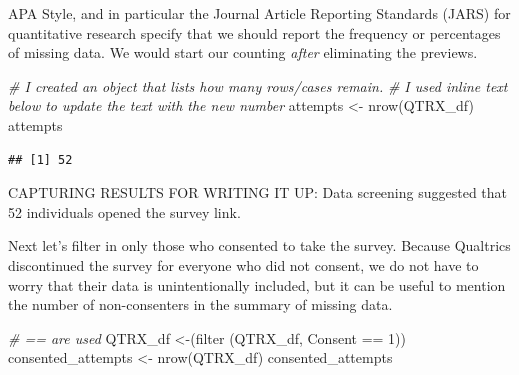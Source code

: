 \documentclass[
  english,
]{book}
\newenvironment{Shaded}{\begin{snugshade}}{\end{snugshade}}
\newcommand{\CommentTok}[1]{\textcolor[rgb]{0.56,0.35,0.01}{\textit{#1}}}
\newcommand{\DecValTok}[1]{\textcolor[rgb]{0.00,0.00,0.81}{#1}}
\newcommand{\FunctionTok}[1]{\textcolor[rgb]{0.00,0.00,0.00}{#1}}
\newcommand{\NormalTok}[1]{#1}
\newcommand{\OtherTok}[1]{\textcolor[rgb]{0.56,0.35,0.01}{#1}}
\newcommand{\SpecialCharTok}[1]{\textcolor[rgb]{0.00,0.00,0.00}{#1}}
\newcommand{\StringTok}[1]{\textcolor[rgb]{0.31,0.60,0.02}{#1}}
\begin{document}
\begin{Shaded}
\end{Shaded}

APA Style, and in particular the Journal Article Reporting Standards (JARS) for quantitative research specify that we should report the frequency or percentages of missing data. We would start our counting \emph{after} eliminating the previews.

\begin{Shaded}
\begin{Highlighting}[]
\CommentTok{\# I created an object that lists how many rows/cases remain.}
\CommentTok{\# I used inline text below to update the text with the new number}
\NormalTok{attempts }\OtherTok{\textless{}{-}} \FunctionTok{nrow}\NormalTok{(QTRX\_df)}
\NormalTok{attempts}
\end{Highlighting}
\end{Shaded}

\begin{verbatim}
## [1] 52
\end{verbatim}

CAPTURING RESULTS FOR WRITING IT UP: Data screening suggested that 52 individuals opened the survey link.

Next let's filter in only those who consented to take the survey. Because Qualtrics discontinued the survey for everyone who did not consent, we do not have to worry that their data is unintentionally included, but it can be useful to mention the number of non-consenters in the summary of missing data.

\begin{Shaded}
\begin{Highlighting}[]
\CommentTok{\# == are used }
\NormalTok{QTRX\_df }\OtherTok{\textless{}{-}}\NormalTok{(}\FunctionTok{filter}\NormalTok{ (QTRX\_df, Consent }\SpecialCharTok{==} \DecValTok{1}\NormalTok{))}
\NormalTok{consented\_attempts }\OtherTok{\textless{}{-}} \FunctionTok{nrow}\NormalTok{(QTRX\_df)}
\NormalTok{consented\_attempts}
\end{Highlighting}
\end{Shaded}
\end{document}
